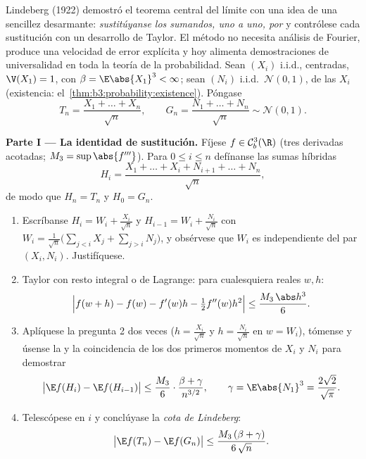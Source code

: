 \begin{problem}
\label{pb:b3:clt:1}
Lindeberg (1922) demostró el teorema central del límite con una idea de
una sencillez desarmante: \emph{sustitúyanse los sumandos, uno a uno,
por } y contrólese cada
sustitución con un desarrollo de Taylor. El método no necesita análisis
de Fourier, produce una velocidad de error explícita y hoy alimenta
demostraciones de universalidad en toda la teoría de la probabilidad.
Sean $(X_i)$ i.i.d., centradas, $\V(X_1) = 1$, con
$\beta = \E\abs{X_1}^3 < \infty$; sean $(N_i)$ i.i.d.\
$\mathcal N(0,1)$,
 de las $X_i$
(existencia: el~\cref{thm:b3:probability:existence}). Póngase
\[
T_n = \frac{X_1 + \dots + X_n}{\sqrt n},
\qquad
G_n = \frac{N_1 + \dots + N_n}{\sqrt n} \sim \mathcal N(0,1).
\]

\medskip
\noindent\textbf{Parte I --- La identidad de sustitución.} Fíjese $f
\in \mathcal C^3_b(\R)$ (tres derivadas
 acotadas;
$M_3 = \sup\abs{f'''}$). Para $0 \leq i \leq n$ defínanse las sumas
híbridas
\[
H_i = \frac{X_1 + \dots + X_i + N_{i+1} + \dots +
N_n}{\sqrt n},
\]
de modo que $H_n = T_n$ y $H_0 = G_n$.
\begin{enumerate}
  \item Escríbanse $H_i = W_i + \frac{X_i}{\sqrt n}$ y $H_{i-1}
        = W_i + \frac{N_i}{\sqrt n}$ con $W_i =
        \frac{1}{\sqrt n}\bigl(\sum_{j<i}X_j +
        \sum_{j>i}N_j\bigr)$, y obsérvese que $W_i$ es
  independiente del par
  $(X_i, N_i)$. Justifíquese. \item Taylor con resto integral o de
  Lagrange: para cualesquiera reales $w, h$:
        \[
        \Bigl|f(w + h) - f(w) - f'(w)h -
        \tfrac12f''(w)h^2\Bigr| \leq
        \frac{M_3\,\abs h^3}{6} .
        \]
  \item Aplíquese la pregunta 2 dos veces ($h = \frac{X_i}{\sqrt n}$ y
  $h = \frac{N_i}{\sqrt n}$ en $w = W_i$), tómense
   y úsense la
   y la
  coincidencia de los dos primeros momentos de $X_i$ y $N_i$ para
  demostrar
        \[
        \bigl|\E f(H_i) - \E f(H_{i-1})\bigr|
        \leq \frac{M_3}{6}\cdot
        \frac{\beta + \gamma}{n^{3/2}},
        \qquad \gamma = \E\abs{N_1}^3 =
        \frac{2\sqrt2}{\sqrt\pi} .
        \]
  \item Telescópese en $i$ y conclúyase la \emph{cota de Lindeberg}:
        \[
        \bigl|\E f(T_n) - \E f(G_n)\bigr| \leq
        \frac{M_3\,(\beta + \gamma)}{6\,\sqrt n} .
        \]
\end{enumerate}


\end{problem}

